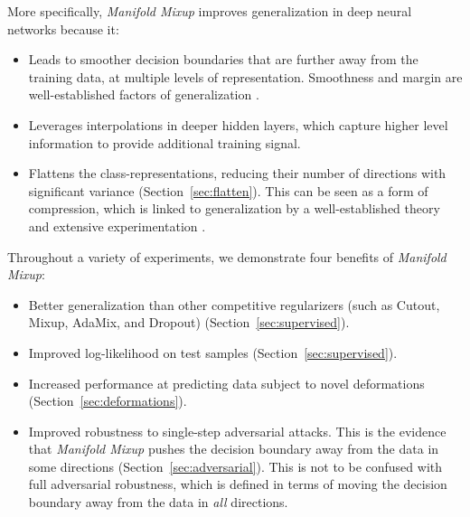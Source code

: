 \documentclass{article} \usepackage[preprint]{nips_2018}
\newcommand{\manifoldmixup}{\textit{Manifold Mixup}}
\begin{document}
More specifically, \manifoldmixup{} improves generalization in deep neural networks because it:
\begin{itemize}
    \item Leads to smoother decision boundaries that are further away from the training data, at multiple levels of representation.  Smoothness and margin are well-established factors of generalization \citep{bartlett1998generalization,lee1995vcsmooth}.  

    \item Leverages interpolations in deeper hidden layers, which capture higher level information \citep{zeiler2013visual} to provide additional training signal.

    \item Flattens the class-representations, reducing their number of directions with significant variance (Section~\ref{sec:flatten}). This can be seen as a form of compression, which is linked to generalization by a well-established theory \citep{tishby2015info,shwartz2017info} and extensive experimentation \citep{alemi2016bottleneck,belghazi2018mine,goyal2018transfer,achille2018information}.
\end{itemize}

Throughout a variety of experiments, we demonstrate four benefits of \manifoldmixup{}:

\begin{itemize}
    \item Better generalization than other competitive regularizers (such as Cutout, Mixup, AdaMix, and Dropout) (Section~\ref{sec:supervised}).

    \item Improved log-likelihood on test samples (Section~\ref{sec:supervised}).
    


    \item Increased performance at predicting data subject to novel deformations (Section~\ref{sec:deformations}).

    \item Improved robustness to single-step adversarial attacks.  This is the evidence  that \manifoldmixup{} pushes the decision boundary away from the data in some directions (Section~\ref{sec:adversarial}). This is not to be confused with full adversarial robustness, which is defined in terms of moving the decision boundary away from the data in \emph{all} directions.
\end{itemize}
\end{document}
